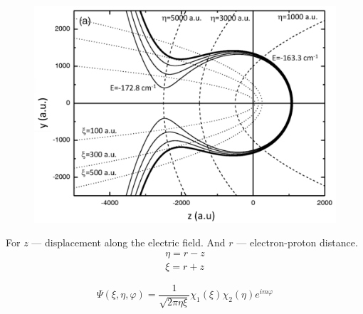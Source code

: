 \begin{minipage}{0.55\textwidth}
    \begin{figure}[h]
    \centering
    \includegraphics[width=1.1\textwidth]{figures/parabola.png}
\end{figure}
\end{minipage}
\hfill
\begin{minipage}{0.35\textwidth}
    For $z$ --- displacement along the electric field.
    And $r$ --- electron-proton distance.
    \begin{gather*}
    	\eta = r - z \\
    	\xi  = r + z 
    \end{gather*}
\end{minipage}
\begin{equation*}
	\Psi(\xi,\eta,\varphi) = \frac{1}{\sqrt{2 \pi \eta \xi}} \chi_1(\xi) \chi_2(\eta) e^{i m \varphi}
\end{equation*}
